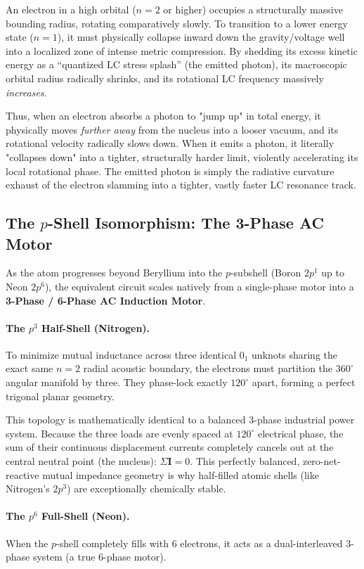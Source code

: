 An electron in a high orbital ($n=2$ or higher) occupies a structurally massive bounding radius, rotating comparatively slowly. To transition to a lower energy state ($n=1$), it must physically collapse inward down the gravity/voltage well into a localized zone of intense metric compression. By shedding its excess kinetic energy as a ``quantized LC stress splash'' (the emitted photon), its macroscopic orbital radius radically shrinks, and its rotational LC frequency massively \textit{increases}. 

Thus, when an electron absorbs a photon to "jump up" in total energy, it physically moves \textit{further away} from the nucleus into a looser vacuum, and its rotational velocity radically slows down. When it emits a photon, it literally "collapses down" into a tighter, structurally harder limit, violently accelerating its local rotational phase. The emitted photon is simply the radiative curvature exhaust of the electron slamming into a tighter, vastly faster LC resonance track.

\subsection{The $p$-Shell Isomorphism: The 3-Phase AC Motor}
As the atom progresses beyond Beryllium into the $p$-subshell (Boron $2p^1$ up to Neon $2p^6$), the equivalent circuit scales natively from a single-phase motor into a \textbf{3-Phase / 6-Phase AC Induction Motor}.

\paragraph{The $p^3$ Half-Shell (Nitrogen).}
To minimize mutual inductance across three identical $0_1$ unknots sharing the exact same $n=2$ radial acoustic boundary, the electrons must partition the $360^\circ$ angular manifold by three. They phase-lock exactly $120^\circ$ apart, forming a perfect trigonal planar geometry. 

This topology is mathematically identical to a balanced 3-phase industrial power system. Because the three loads are evenly spaced at $120^\circ$ electrical phase, the sum of their continuous displacement currents completely cancels out at the central neutral point (the nucleus): $\Sigma \mathbf{I} = 0$. This perfectly balanced, zero-net-reactive mutual impedance geometry is why half-filled atomic shells (like Nitrogen's $2p^3$) are exceptionally chemically stable.

\paragraph{The $p^6$ Full-Shell (Neon).}
When the $p$-shell completely fills with 6 electrons, it acts as a dual-interleaved 3-phase system (a true 6-phase motor).


